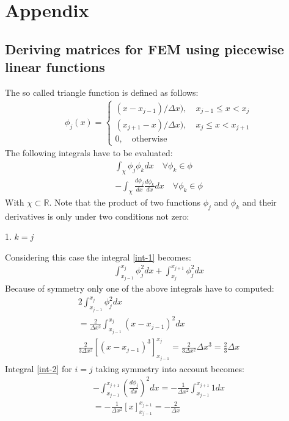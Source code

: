 \chapter{Appendix}
\section{Deriving matrices for FEM using piecewise linear functions} \label{ap-mat-der}
The so called triangle function is defined as follows:
\begin{gather}
    \phi_j(x)= 
\begin{cases}
    (x - x_{j-1}) / \Delta x), \quad x_{j-1} \leq x <  x_{j}\\
    (x_{j+1} - x) / \Delta x), \quad x_{j} \leq x <  x_{j + 1}\\
    0,              \quad \text{otherwise}
\end{cases} \label{def-phi}
\end{gather}
\cite{Gustafsson2011d}
The following integrals have to be evaluated:
\begin{gather}
\int_{\chi} \phi_{j}\phi_{k}dx \quad \forall \phi_{k} \in \phi   \label{int-1} \\
-\int_{\chi} \frac{d\phi_{j}}{dx}\frac{d\phi_{k}}{dx}dx  \quad \forall \phi_{k} \in \phi  \label{int-2}
\end{gather}
With \(\chi \subset \mathbb{R}\). 
Note that the product of two functions \(\phi_j\) and \(\phi_k\) and their derivatives is only under two conditions not zero:

1. \(k = j\)

Considering this case the integral  \ref{int-1} becomes:
\begin{gather}
\int_{x_{j-1}}^{x_{j}} \phi_j^{2} dx + \int_{x_{j}}^{x_{j+1}} \phi_j^{2} dx 
\end{gather}
Because of symmetry only one of the above integrals have to computed:
\begin{gather}
2 \int_{x_{j-1}}^{x_{j}} \phi_j^{2} dx \\
= \frac{2}{\Delta x^2} \int_{x_{j-1}}^{x_{j}} (x-x_{j-1})^{2} dx \\
\frac{2}{3 \Delta x^{2}} \left[ (x - x_{j-1})^3\right]_{x_{j-1}}^{{x_j}} = \frac{2}{3 \Delta x^{2}} \Delta x^3 = \frac{2}{3}\Delta x
\end{gather}
Integral \ref{int-2} for \(i = j\) taking symmetry into account becomes:
\begin{gather}
-\int_{x_{j-1}}^{x_{j+1}} (\frac{d \phi_j}{dx})^2 dx = -\frac{1}{\Delta x^2} \int_{x_{j-1}}^{x_{j+1}} 1 dx\\
 = -\frac{1}{\Delta x^2}  \left[ x \right]_{x_{j-1}}^{x_{j+1}} = -\frac{2}{\Delta x}
\end{gather}

